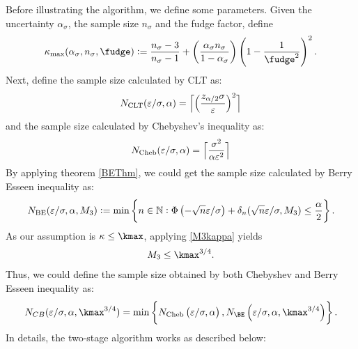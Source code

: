 \documentclass{iitthesis}
\begin{document}
Before illustrating the algorithm, we define some parameters. Given the uncertainty $\alpha_{\sigma}$, the sample size $n_{\sigma}$ and the fudge factor, define
\begin{equation}
\label{kappamaxdef}
\kappa_{\max} (\alpha_\sigma, n_{\sigma},\fudge):= \frac{n_{\sigma}-3}{n_{\sigma}-1} + \left(\frac{ \alpha_\sigma n_{\sigma}}{1-\alpha_\sigma}\right) \left(1 - \frac{1}{\fudge^2}\right)^2.
\end{equation}
Next, define the sample size calculated by CLT as:
\begin{equation}\label{NCLT}
N_{\mathrm{CLT}}(\varepsilon/\sigma,\alpha)
= 
\Bigl\lceil
\Bigl(
\frac{z_{\alpha/2}\sigma}{\varepsilon}
\Bigr)^2
\Bigr\rceil
\end{equation}
and the sample size calculated by Chebyshev's inequality as:
\begin{equation}\label{NCheby}
N_{\text{Cheb}}(\varepsilon/\sigma,\alpha)
= 
\Bigl\lceil\frac{\sigma^2}{\alpha\varepsilon^2}\Bigr\rceil
\end{equation}
By applying theorem \ref{BEThm}, we could get the sample size calculated by Berry Esseen inequality as:
\begin{equation}\label{NBE}
N_{\text{BE}}(\varepsilon/\sigma,\alpha,M_3) := \min \left \{ n \in \mathbb{N} : \Phi\left(-\sqrt{n}\varepsilon/\sigma  \right)+\delta_n(\sqrt{n}\varepsilon/\sigma,M_3)
\le \frac{\alpha}{2} \right \}.
\end{equation}
As our assumption is $\kappa \leq \kmax$, applying \eqref{M3kappa} yields 
\begin{align}\label{M3kmax}
M_3 \leq \kmax^{3/4}.
\end{align}
Thus, we could define the sample size obtained by both Chebyshev and Berry Esseen inequality as:
\begin{align}\label{NCB}
N_{CB} (\varepsilon/\sigma,\alpha, \kmax^{3/4})  = \min \left \{ N_{\Cheb}\left(\varepsilon/\sigma,\alpha\right),N_{\BE}\left(\varepsilon/\sigma,\alpha, \kmax^{3/4}\right)\right \}.
\end{align}
In details, the two-stage algorithm works as described below:
\end{document}
